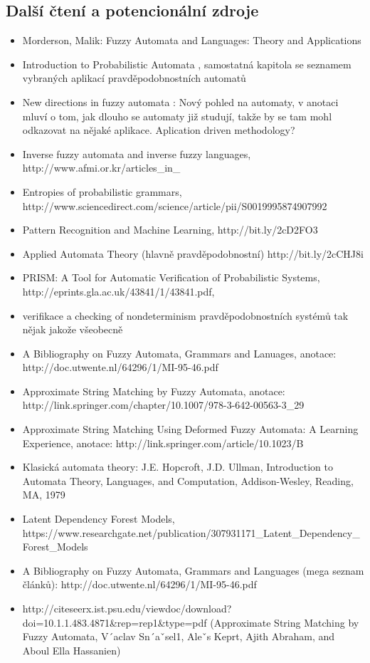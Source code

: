\documentclass[a4paper,10pt]{article}
\begin{document}
\subsection{Další čtení a potencionální zdroje}
\begin{itemize}
 \item Morderson, Malik: Fuzzy Automata and Languages: Theory and Applications \cite{MorMal-FuzzAutAndLangs}
 \item Introduction to Probabilistic Automata \cite{Paz-IntroProbAut}, samostatná kapitola se seznamem vybraných aplikací pravděpodobnostních automatů
 \item New directions in fuzzy automata \cite{DooKre-NewDirFuzzAut}: Nový pohled na automaty, v anotaci mluví o tom, jak dlouho se automaty již studují, takže by se tam mohl odkazovat na nějaké aplikace. Aplication driven methodology?
 \item Inverse fuzzy automata and inverse fuzzy languages, http://www.afmi.or.kr/articles\_in\_%
 \item Entropies of probabilistic grammars, http://www.sciencedirect.com/science/article/pii/S0019995874907992
 \item Pattern Recognition and Machine Learning, http://bit.ly/2cD2FO3
 \item Applied Automata Theory (hlavně pravděpodobnostní) http://bit.ly/2cCHJ8i
 \item PRISM: A Tool for Automatic Verification of Probabilistic Systems, http://eprints.gla.ac.uk/43841/1/43841.pdf,
 \item verifikace a checking of nondeterminism pravděpodobnostních systémů tak nějak jakože všeobecně
 \item A Bibliography on Fuzzy Automata, Grammars and Lanuages, anotace: http://doc.utwente.nl/64296/1/MI-95-46.pdf
 \item Approximate String Matching by Fuzzy Automata, anotace: http://link.springer.com/chapter/10.1007/978-3-642-00563-3\_29
 \item Approximate String Matching Using Deformed Fuzzy Automata: A Learning Experience, anotace: http://link.springer.com/article/10.1023/B%
 \item Klasická automata theory: J.E. Hopcroft, J.D. Ullman, Introduction to Automata Theory, Languages, and Computation, Addison-Wesley, Reading,
MA, 1979
 \item Latent Dependency Forest Models, https://www.researchgate.net/publication/307931171\_Latent\_Dependency\_Forest\_Models
 \item A Bibliography on Fuzzy Automata, Grammars and Languages (mega seznam článků): http://doc.utwente.nl/64296/1/MI-95-46.pdf
 \item http://citeseerx.ist.psu.edu/viewdoc/download?doi=10.1.1.483.4871\&rep=rep1\&type=pdf (Approximate String Matching by Fuzzy
Automata, V´aclav Sn´aˇsel1, Aleˇs Keprt, Ajith Abraham, and Aboul Ella Hassanien)
 
 \end{itemize}
\end{document}
